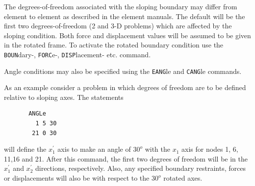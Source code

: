 The degrees-of-freedom associated with the sloping
boundary may differ from element to element as described in
the element manuals.  The default will be the first two
degrees-of-freedom (2 and 3-D problems) which are affected by the sloping
condition.  Both force and displacement values will be
assumed to be given in the rotated frame. To activate the rotated
boundary condition use the {\tt BOUN}dary-, {\tt FORC}e-, 
{\tt DISP}lacement- etc. command.

Angle conditions may also be specified using the {\tt EANG}le and {\tt CANG}le
commands.
\pagebreak


As an example consider a problem in which degrees of freedom are to be defined
relative to sloping axes.  The statements
\begin{verbatim}
       ANGLe
         1 5 30
        21 0 30

\end{verbatim}
will define the $x_1^\prime$ axis to make an angle of $30^o$ with the $x_1$
axis for nodes 1, 6, 11,16 and 21.  After this command, the first two
degrees of freedom will be in the $x_1^\prime$ and $x_2^\prime$ directions,
respectively.  Also, any specified boundary restraints, forces or displacements
will also be with respect to the $30^o$ rotated axes.
\vfil\eject
